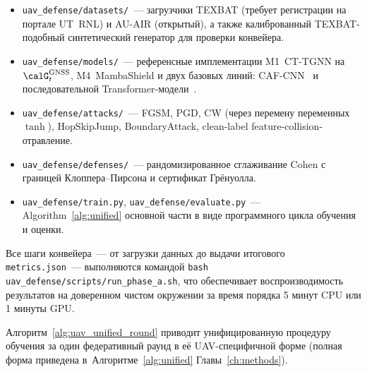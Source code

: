 \begin{itemize}\setlength\itemsep{0.1em}
\item \texttt{uav\_defense/datasets/}~--- загрузчики TEXBAT (требует
регистрации на портале UT~RNL) и AU-AIR (открытый), а также калиброванный
TEXBAT-подобный синтетический генератор для проверки конвейера.
\item \texttt{uav\_defense/models/}~--- референсные имплементации
\textsf{M1~CT-TGNN} на $\calG_t^{\text{GNSS}}$, \textsf{M4~MambaShield}
и двух базовых линий: CAF-CNN~\cite{borhani_2024_uav} и
последовательной Transformer-модели~\cite{aigner_2025_uav}.
\item \texttt{uav\_defense/attacks/}~--- FGSM, PGD, CW
(через перемену переменных $\tanh$), HopSkipJump, BoundaryAttack,
clean-label feature-collision-отравление.
\item \texttt{uav\_defense/defenses/}~--- рандомизированное сглаживание
Cohen с границей Клоппера--Пирсона и сертификат Грёнуолла.
\item \texttt{uav\_defense/train.py},
\texttt{uav\_defense/evaluate.py}~--- Algorithm~\ref{alg:unified}
основной части в виде программного цикла обучения и оценки.
\end{itemize}

Все шаги конвейера~--- от загрузки данных до выдачи итогового
\texttt{metrics.json}~--- выполняются командой
\texttt{bash uav\_defense/scripts/run\_phase\_a.sh}, что обеспечивает
воспроизводимость результатов на доверенном чистом окружении за время
порядка 5 минут CPU или 1 минуты GPU.

Алгоритм~\ref{alg:uav_unified_round} приводит унифицированную процедуру
обучения за один федеративный раунд в её UAV-специфичной форме (полная
форма приведена в~Алгоритме~\ref{alg:unified} Главы~\ref{ch:methods}).

